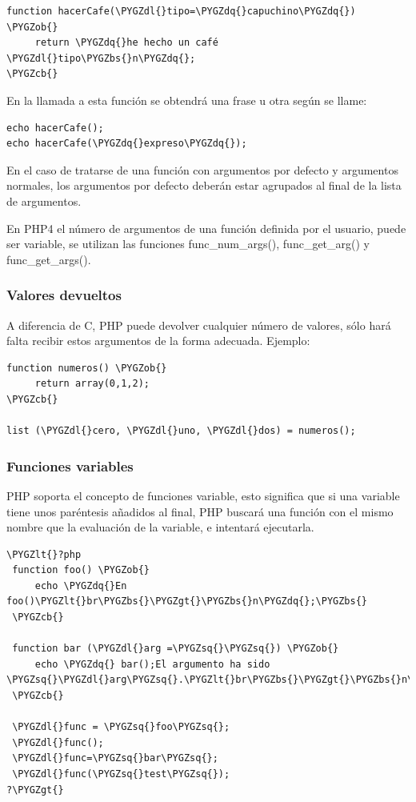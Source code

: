 \documentclass[a5paper,10pt,spanish]{sphinxmanual}
\def\PYGZbs{\char`\\}
\def\PYGZob{\char`\{}
\def\PYGZcb{\char`\}}
\def\PYGZlt{\char`\<}
\def\PYGZgt{\char`\>}
\def\PYGZdl{\char`\$}
\def\PYGZsq{\char`\'}
\def\PYGZdq{\char`\"}
\begin{document}
\begin{Verbatim}[commandchars=\\\{\}]
function hacerCafe(\PYGZdl{}tipo=\PYGZdq{}capuchino\PYGZdq{}) \PYGZob{}
     return \PYGZdq{}he hecho un café \PYGZdl{}tipo\PYGZbs{}n\PYGZdq{};
\PYGZcb{}
\end{Verbatim}

En la llamada a esta función se obtendrá una frase u otra según se
llame:

\begin{Verbatim}[commandchars=\\\{\}]
echo hacerCafe();
echo hacerCafe(\PYGZdq{}expreso\PYGZdq{});
\end{Verbatim}

En el caso de tratarse de una función con argumentos por defecto y
argumentos normales, los argumentos por defecto deberán estar agrupados
al final de la lista de argumentos.

En PHP4 el número de argumentos de una función definida por el usuario,
puede ser variable, se utilizan las funciones
func\_num\_args(),
func\_get\_arg() y
func\_get\_args().


\subsubsection{Valores devueltos}
\label{Tutorial1_Conceptos.md:valores-devueltos}
A diferencia de C, PHP puede devolver cualquier número de valores, sólo
hará falta recibir estos argumentos de la forma adecuada. Ejemplo:

\begin{Verbatim}[commandchars=\\\{\}]
function numeros() \PYGZob{}
     return array(0,1,2);
\PYGZcb{}

list (\PYGZdl{}cero, \PYGZdl{}uno, \PYGZdl{}dos) = numeros();
\end{Verbatim}


\subsubsection{Funciones variables}
\label{Tutorial1_Conceptos.md:funciones-variables}
PHP soporta el concepto de funciones variable, esto significa que si una
variable tiene unos paréntesis añadidos al final, PHP buscará una
función con el mismo nombre que la evaluación de la variable, e
intentará ejecutarla.

\begin{Verbatim}[commandchars=\\\{\}]
\PYGZlt{}?php
 function foo() \PYGZob{}
     echo \PYGZdq{}En foo()\PYGZlt{}br\PYGZbs{}\PYGZgt{}\PYGZbs{}n\PYGZdq{};\PYGZbs{}
 \PYGZcb{}

 function bar (\PYGZdl{}arg =\PYGZsq{}\PYGZsq{}) \PYGZob{}
     echo \PYGZdq{} bar();El argumento ha sido \PYGZsq{}\PYGZdl{}arg\PYGZsq{}.\PYGZlt{}br\PYGZbs{}\PYGZgt{}\PYGZbs{}n\PYGZdq{};\PYGZbs{}
 \PYGZcb{}

 \PYGZdl{}func = \PYGZsq{}foo\PYGZsq{};
 \PYGZdl{}func();
 \PYGZdl{}func=\PYGZsq{}bar\PYGZsq{};
 \PYGZdl{}func(\PYGZsq{}test\PYGZsq{});
?\PYGZgt{}
\end{Verbatim}
\end{document}
